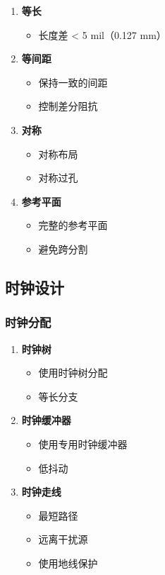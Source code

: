 \begin{enumerate}
  \item \textbf{等长}
    \begin{itemize}
      \item 长度差 < 5 mil（0.127 mm）
    \end{itemize}

  \item \textbf{等间距}
    \begin{itemize}
      \item 保持一致的间距
      \item 控制差分阻抗
    \end{itemize}

  \item \textbf{对称}
    \begin{itemize}
      \item 对称布局
      \item 对称过孔
    \end{itemize}

  \item \textbf{参考平面}
    \begin{itemize}
      \item 完整的参考平面
      \item 避免跨分割
    \end{itemize}
\end{enumerate}

\subsection{时钟设计}

\subsubsection{时钟分配}

\begin{enumerate}
  \item \textbf{时钟树}
    \begin{itemize}
      \item 使用时钟树分配
      \item 等长分支
    \end{itemize}

  \item \textbf{时钟缓冲器}
    \begin{itemize}
      \item 使用专用时钟缓冲器
      \item 低抖动
    \end{itemize}

  \item \textbf{时钟走线}
    \begin{itemize}
      \item 最短路径
      \item 远离干扰源
      \item 使用地线保护
    \end{itemize}
\end{enumerate}

